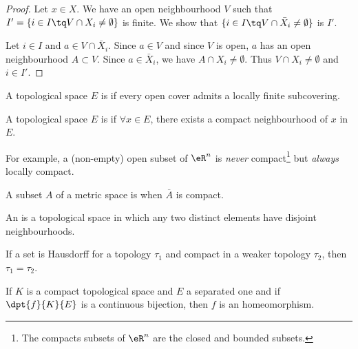 \begin{proof}
	Let \( x\in X\). We have an open neighbourhood \( V\) such that \( I'=\{ i\in I\tq V\cap X_i\neq\emptyset \}\) is finite. We show that \( \{ i\in I\tq V\cap \bar X_i\neq \emptyset \}\) is \( I'\).

	Let \( i\in I\) and \(a\in V\cap \bar X_i\). Since \( a\in V\) and since  \( V\) is open, \( a\) has an open neighbourhood \( A\subset V\). Since \( a\in\bar X_i\), we have \( A\cap X_i\neq \emptyset\). Thus \( V\cap X_i\neq \emptyset\) and \(  i\in I'\).
\end{proof}

\begin{definition}	\label{DefParacompact}
	A topological space $E$ is  if every open cover admits a locally finite subcovering.
\end{definition}


\begin{definition}
	A topological space $E$ is  if $\forall x\in E$, there exists a compact neighbourhood of $x$ in $E$.
\end{definition}

For example, a (non-empty) open subset of $\eR^n$ is \emph{never} compact\footnote{The compacts subsets of $\eR^n$ are the closed and bounded subsets.} but \emph{always} locally compact.

\begin{definition}
	A subset $A$ of a metric space is  when $\overline{A}$ is compact.
\end{definition}

\begin{definition}
	An  is a topological space in which any two distinct elements have disjoint neighbourhoods.
\end{definition}

\begin{lemma}
	If a set is Hausdorff for a topology $\tau_1$ and compact in a weaker topology $\tau_2$, then $\tau_1=\tau_2$.\label{lem:Hausweak}
\end{lemma}

\begin{proposition}
	If $K$ is a compact topological space and $E$ a separated one and if $\dpt{f}{K}{E}$ is a continuous bijection, then $f$ is an homeomorphism. \label{lem:wiki}
\end{proposition}

